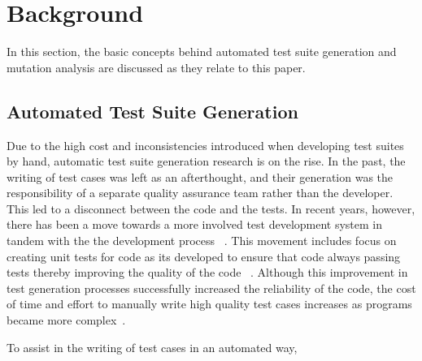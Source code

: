 \section{Background}
\label{sec:background}
In this section, the basic concepts behind automated test suite generation and mutation analysis are discussed as they relate to this paper.

\subsection{Automated Test Suite Generation}
Due to the high cost and inconsistencies introduced when developing test suites by hand, automatic test suite generation research is on the rise.  In the past, the writing of test cases was left as an afterthought, and their generation was the responsibility of a separate quality assurance team rather than the developer.  This led to a disconnect between the code and the tests.  In recent years, however, there has been a move towards a more involved test development system in tandem with the the development process ~\cite{Gelperin:1988:GST:62959.62965}.  This movement includes focus on creating unit tests for code as its developed to ensure that code always passing tests thereby improving the quality of the code ~\cite{Canfora:2006:EAT:1159733.1159788}.  Although this improvement in test generation processes successfully increased the reliability of the code, the cost of time and effort to manually write high quality test cases increases as programs became more complex~\cite{clarke1998automated}. 

To assist in the writing of test cases in an automated way, 